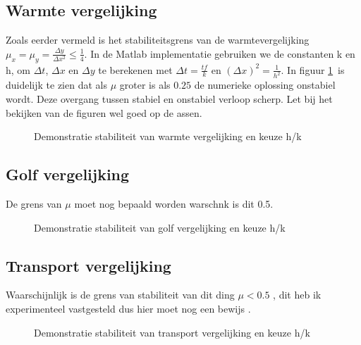 \documentclass[11pt]{article} %
\begin{document}
	\subsection{Warmte vergelijking}
	Zoals eerder vermeld is het stabiliteitsgrens van de warmtevergelijking  $\mu_x=\mu_y=\frac{\Delta y}{\Delta x^2} \leq \frac{1}{4}$. In de Matlab implementatie gebruiken we de constanten k en h, om $\Delta t$, $\Delta x$ en $\Delta y$ te berekenen met $\Delta t=\frac{tf}{k}$ en $(\Delta x)^2 = \frac{1}{h^2}$. In figuur \ref{fig:Warmte}\ is duidelijk te zien dat als $\mu $ groter is als $0.25$ de numerieke oplossing onstabiel wordt. Deze overgang tussen stabiel en onstabiel verloop scherp. Let bij het bekijken van de figuren wel goed op de assen.


	\begin{figure}[H]
		\centering
		\hfill
	\caption{Demonstratie stabiliteit van warmte vergelijking en keuze h/k}
	\label{fig:Warmte}
	\end{figure}
	
	\subsection{Golf vergelijking}
	De grens van $\mu$ moet nog bepaald worden warschnk is dit 0.5.
	\begin{figure}[H]
		\centering
		\hfill
		\caption{Demonstratie stabiliteit van golf vergelijking en keuze h/k}
	\end{figure}
	\subsection{Transport vergelijking}
	Waarschijnlijk is de grens van stabiliteit van dit ding $\mu<0.5$ , dit heb ik experimenteel vastgesteld dus hier moet nog een bewijs .
	\begin{figure}[H]
		\centering
		\hfill
		\caption{Demonstratie stabiliteit van transport vergelijking en keuze h/k}
	\end{figure}
\clearpage
\end{document}
